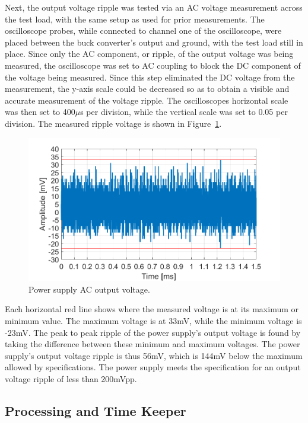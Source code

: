 Next, the output voltage ripple was tested via an AC voltage measurement across the test load, with the same setup as used for prior measurements. The oscilloscope probes, while connected to channel one of the oscilloscope, were placed between the buck converter's output and ground, with the test load still in place. Since only the AC component, or ripple, of the output voltage was being measured, the oscilloscope was set to AC coupling to block the DC component of the voltage being measured. Since this step eliminated the DC voltage from the measurement, the y-axis scale could be decreased so as to obtain a visible and accurate measurement of the voltage ripple. The oscilloscopes horizontal scale was then set to 400$\mu$s per division, while the vertical scale was set to 0.05 per division. The measured ripple voltage is shown in Figure~\ref{fig:voltage_ripple}.

\begin{figure}[H]
    \centering
    \includegraphics[width=1\textwidth]{Figures/5_results/supply1_polished_draft.png} 
    \caption{Power supply AC output voltage.}
    \label{fig:voltage_ripple}
\end{figure}

Each horizontal red line shows where the measured voltage is at its maximum or minimum value. The maximum voltage is at 33mV, while the minimum voltage is -23mV. The peak to peak ripple of the power supply's output voltage is found by taking the difference between these minimum and maximum voltages. The power supply's output voltage ripple is thus 56mV, which is 144mV below the maximum allowed by specifications. The power supply meets the specification for an output voltage ripple of less than 200mVpp.


\subsection{Processing and Time Keeper}

